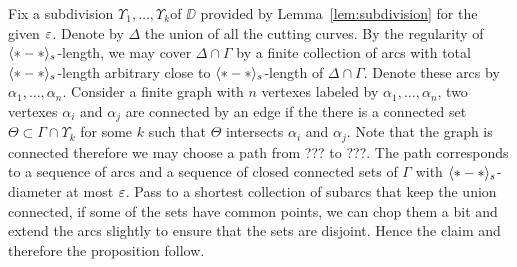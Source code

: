 Fix a subdivision $\Upsilon_1,\dots,\Upsilon_k$of $\DD$ provided by Lemma~\ref{lem:subdivision} for the given $\varepsilon$.
Denote by $\Delta$ the union of all the cutting curves.
By the regularity of $\langle{*}-{*}\rangle_s$-length, we may cover $\Delta\cap\Gamma$ by a finite collection of arcs with total  $\langle{*}-{*}\rangle_s$-length arbitrary close to $\langle{*}-{*}\rangle_s$-length of $\Delta\cap\Gamma$.
Denote these arcs by $\alpha_1,\dots,\alpha_n$.
Consider a finite graph with $n$ vertexes labeled by $\alpha_1,\dots,\alpha_n$,
two vertexes $\alpha_i$ and $\alpha_j$ are connected by an edge if the there is a connected set $\Theta\subset \Gamma\cap\Upsilon_k$ for some $k$ such that $\Theta$ intersects $\alpha_i$ and $\alpha_j$.
Note that the graph is connected therefore we may choose a path from ??? to ???.
The path corresponds to a sequence of arcs and a sequence of closed connected sets of $\Gamma$ with $\langle{*}-{*}\rangle_s$-diameter at most $\varepsilon$.
Pass to a shortest collection of subarcs that keep the union connected, if some of the sets have common points, we can chop them a bit and extend the arcs slightly to ensure that the sets are disjoint.
Hence the claim and therefore the proposition follow. 
\qeds



